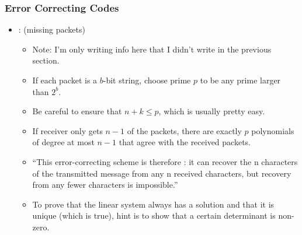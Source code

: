 \documentclass[12pt]{article}
\begin{document}
\subsubsection{Error Correcting Codes}
\begin{itemize}
	\item {}: (missing packets)
	\begin{itemize}
		\item Note: I'm only writing info here that I didn't write in the previous section.
		\item If each packet is a $b$-bit string, choose prime $p$ to be any prime larger than $2^{b}$. 
		\item Be careful to ensure that $n+k \le p$, which is usually pretty easy. 
		\item If receiver only gets $n-1$ of the packets, there are exactly $p$ polynomials of degree at most $n-1$ that agree with the received packets. 
		\item ``This error-correcting scheme is therefore : it can recover the n characters of the transmitted message from any n received characters, but recovery from any fewer characters is impossible.''
		\item To prove that the linear system always has a solution and that it is unique (which is true), hint is to show that a certain determinant is non-zero. 
	\end{itemize}
	

\end{itemize}
\end{document}
